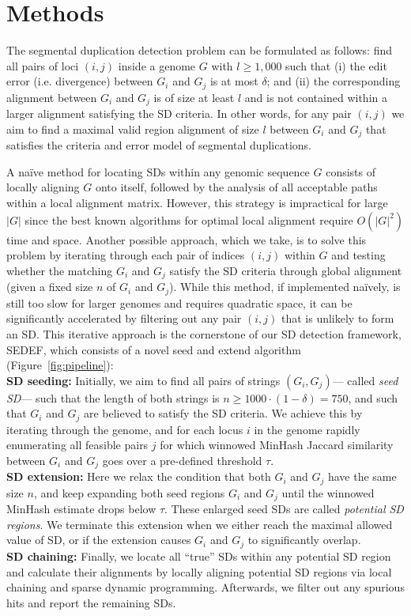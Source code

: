 \documentclass{article}
\begin{document}
\section{Methods}

The segmental duplication detection problem can be formulated as follows:
find all pairs of loci $(i, j)$ inside a genome $G$ with $l \geq 1,000$
such that (i) the edit error (i.e. divergence) between $G_i$ and $G_j$ is at most $\delta$; and (ii) the corresponding alignment between $G_i$ and $G_j$ is of size at least $l$ and is not contained within a larger alignment satisfying the SD criteria. In other words, for any pair $(i,j)$ we aim to find a maximal valid region alignment of size $l$ between $G_i$ and $G_j$ that satisfies the criteria and error model of segmental duplications. 

A na\"{i}ve method for locating SDs within any genomic sequence $G$ consists of locally aligning $G$ onto itself, followed by the analysis of all acceptable paths within a local alignment matrix. However, this strategy is impractical for large $|G|$ since the best known algorithms for optimal local alignment require $O(|G|^2)$ time and space. Another possible approach, which we take, is to solve this problem by iterating through each pair of indices $(i,j)$ within $G$ and testing whether the matching $G_i$ and $G_j$ satisfy the SD criteria through global alignment (given a fixed size $n$ of $G_i$ and $G_j$). While this method, if implemented na\"{i}vely, is still too slow for larger genomes and requires quadratic space, it can be significantly accelerated by filtering out any pair $(i, j)$ that is unlikely to form an SD. This iterative approach is the cornerstone of our SD detection framework, SEDEF, which consists of a novel seed and extend algorithm (Figure~\ref{fig:pipeline}):\\
\textbf{SD seeding:} 
Initially, we aim to find all pairs of strings $(G_i,G_j)$--- called \emph{seed SD}--- such that the length of both strings is $n \geq 1000\cdot(1 - \delta) = 750$, and such that $G_i$ and $G_j$ are believed to satisfy the SD criteria. We achieve this by iterating through the genome, and for each locus $i$ in the genome rapidly enumerating all feasible pairs $j$ for which winnowed MinHash Jaccard similarity between $G_i$ and $G_j$ goes over a pre-defined threshold $\tau$. \\
\textbf{SD extension:} 
Here we relax the condition that both $G_i$ and $G_j$ have the same size $n$, and keep expanding both seed regions $G_i$ and $G_j$ until the winnowed MinHash estimate drops below $\tau$. These enlarged seed SDs are called \emph{potential SD regions}. We terminate this  extension when we either reach the maximal allowed value of SD, or if the extension causes $G_i$ and $G_j$ to significantly overlap. \\
\textbf{SD chaining:} 
Finally, we locate all ``true'' SDs within any potential SD region and calculate their alignments by locally aligning potential SD regions via local chaining and sparse dynamic programming. Afterwards, we filter out any spurious hits and report the remaining SDs.
\end{document}
